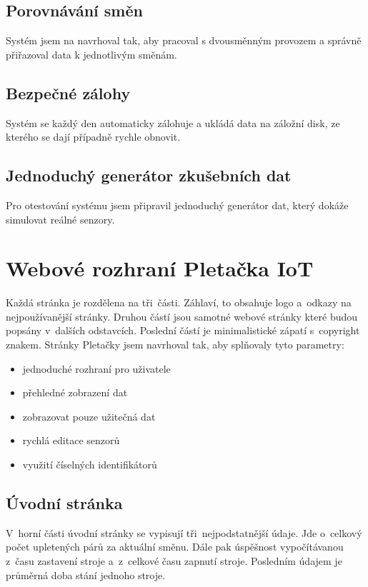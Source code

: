 \subsection{Porovnávání směn}
Systém jsem na navrhoval tak, aby pracoval s dvousměnným provozem a správně přiřazoval data k jednotlivým směnám.


\subsection{Bezpečné zálohy}
Systém se každý den automaticky zálohuje a ukládá data na záložní disk, ze kterého se dají případně rychle obnovit.


\subsection{Jednoduchý generátor zkušebních dat}
Pro otestování systému jsem připravil jednoduchý generátor dat, který dokáže simulovat reálné senzory.



\section{Webové rozhraní Pletačka IoT}
Každá stránka je rozdělena na tři~části. Záhlaví, to obsahuje logo a~odkazy na nejpoužívanější stránky.
Druhou částí jsou samotné webové stránky které budou popsány v~dalších odstavcích.
Poslední částí je minimalistické zápatí s~copyright znakem.\newline
Stránky Pletačky jsem navrhoval tak, aby splňovaly tyto parametry:

\begin{itemize}
    \item jednoduché rozhraní pro uživatele
    \item přehledné zobrazení dat
    \item zobrazovat pouze užitečná dat
    \item rychlá editace senzorů
    \item využití číselných identifikátorů
\end{itemize}


\subsection{Úvodní stránka}
V~horní části úvodní stránky se vypisují tři~nejpodstatnější údaje.
Jde o~celkový počet upletených párů za aktuální směnu.
Dále pak úspěšnost vypočítávanou z~času zastavení stroje a~z~celkové času zapnutí stroje.
Posledním údajem je průměrná doba stání jednoho stroje.   

